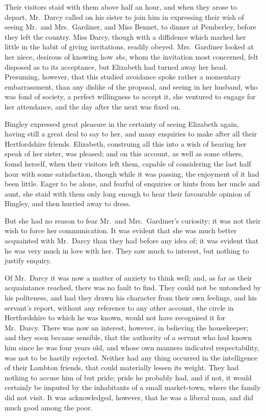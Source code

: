 Their visitors staid with them above half an hour, and
when they arose to depart, Mr.\ Darcy called on his sister
to join him in expressing their wish of seeing Mr.\ and
Mrs.\ Gardiner, and Miss Bennet, to dinner at Pemberley,
before they left the country. Miss Darcy, though with
a diffidence which marked her little in the habit of giving
invitations, readily obeyed. Mrs.\ Gardiner looked at her
niece, desirous of knowing how \textit{she}, whom the invitation
most concerned, felt disposed as to its acceptance, but
Elizabeth had turned away her head. Presuming,
however, that this studied avoidance spoke rather a momentary
embarrassment, than any dislike of the proposal, and
seeing in her husband, who was fond of society, a perfect
willingness to accept it, she ventured to engage for her
attendance, and the day after the next was fixed on.

Bingley expressed great pleasure in the certainty of
seeing Elizabeth again, having still a great deal to say
to her, and many enquiries to make after all their Hertfordshire
friends. Elizabeth, construing all this into a wish
of hearing her speak of her sister, was pleased; and on
this account, as well as some others, found herself, when
their visitors left them, capable of considering the last
half hour with some satisfaction, though while it was
passing, the enjoyment of it had been little. Eager to
be alone, and fearful of enquiries or hints from her uncle
and aunt, she staid with them only long enough to hear
their favourable opinion of Bingley, and then hurried
away to dress.

But she had no reason to fear Mr.\ and Mrs.\ Gardiner’s
curiosity; it was not their wish to force her communication.
It was evident that she was much better acquainted
with Mr.\ Darcy than they had before any idea
of; it was evident that he was very much in love with
her. They saw much to interest, but nothing to justify
enquiry.

Of Mr.\ Darcy it was now a matter of anxiety to think
well; and, as far as their acquaintance reached, there was
no fault to find. They could not be untouched by his
politeness, and had they drawn his character from their
own feelings, and his servant’s report, without any reference
to any other account, the circle in Hertfordshire to
which he was known, would not have recognised it for
Mr.\ Darcy. There was now an interest, however, in
believing the housekeeper; and they soon became sensible,
that the authority of a servant who had known him since
he was four years old, and whose own manners indicated
respectability, was not to be hastily rejected. Neither
had any thing occurred in the intelligence of their Lambton
friends, that could materially lessen its weight. They had
nothing to accuse him of but pride; pride he probably
had, and if not, it would certainly be imputed by the
inhabitants of a small market-town, where the family
did not visit. It was acknowledged, however, that he
was a liberal man, and did much good among the poor.

